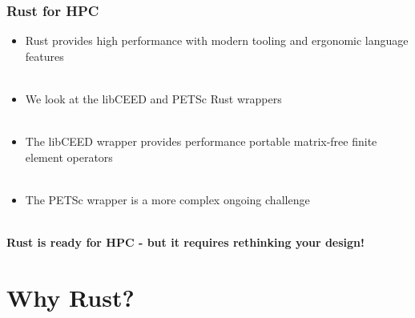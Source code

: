 \documentclass{beamer}
\begin{document}
\begin{frame}
\begin{center}
\frametitle{Rust for HPC}

\begin{itemize}

\item Rust provides high performance with modern tooling and ergonomic language features\\

~\\

\item We look at the libCEED and PETSc Rust wrappers\\

~\\

\item The libCEED wrapper provides performance portable matrix-free finite element operators\\

~\\

\item The PETSc wrapper is a more complex ongoing challenge\\

\end{itemize}

~\\

\bf{Rust is ready for HPC - but it requires rethinking your design!}

\end{center}
\end{frame}

\section{Why Rust?}
\end{document}
